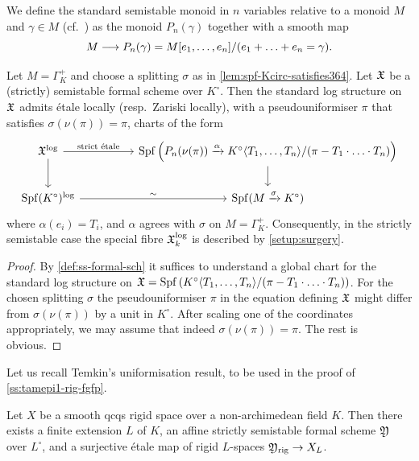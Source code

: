 We define the standard semistable monoid in $n$ variables relative to a monoid $M$ and $\gamma \in M$ (cf.\ \cite[Example~2.4.5]{AHLS-Log}) as the monoid $P_n(\gamma)$ together with a smooth map 
\[
M \longrightarrow P_n(\gamma) = M[e_1,\ldots,e_n]/(e_1 + \ldots + e_n = \gamma).
\]

\begin{lem} \label{lem:strictly-semistable-formal-scheme-reduces-to-setup364}
Let $M = \Gamma_K^+$ and choose a splitting $\sigma$ as in \cref{lem:spf-Kcirc-satisfies364}. 
Let ${\mathfrak{X}}$ be a (strictly) semistable formal scheme over $K^\circ$. Then the standard log structure on ${\mathfrak{X}}$ admits \'etale  locally (resp.\ Zariski locally), with a pseudouniformiser $\pi$ that satisfies 
$\sigma(\nu(\pi)) = \pi$, charts of the form 
\[
    \begin{tikzcd}
        \fX^{\log} \arrow[rr,"\text{strict \'etale}"] \arrow[d]
        && \Spf\left(P_n(\nu(\pi)) \xrightarrow{\alpha} K^\circ\langle T_1,\dots, T_n\rangle/(\pi - T_1\cdot\ldots\cdot T_n) \right) \arrow[d] \\
        \Spf(K^\circ)^{\log}  \arrow[rr,"\sim"] & &  
        \Spf(M \xrightarrow{\sigma} K^\circ) 
    \end{tikzcd}
\]
where $\alpha(e_i) = T_i$, and $\alpha$ agrees with $\sigma$ on $M = \Gamma_K^+$.
Consequently, in the strictly semistable case the special fibre ${\mathfrak{X}}^{\log}_k$ is described by \cref{setup:surgery}. 
\end{lem}

\begin{proof}
    By \cref{def:ss-formal-sch} it suffices to understand a global chart for the standard log structure on ${\mathfrak{X}} = \operatorname{Spf}\left( K^\circ\langle T_1,\dots, T_n\rangle/(\pi - T_1\cdot\ldots\cdot T_n) \right)$. For the chosen splitting $\sigma$ the pseudouniformiser $\pi$ in the equation defining ${\mathfrak{X}}$ might differ from $\sigma(\nu(\pi))$ by a unit in $K^\circ$. After scaling one of the coordinates appropriately, we may assume that indeed $\sigma(\nu(\pi)) = \pi$. The rest is obvious.     
\end{proof}

Let us recall Temkin's uniformisation result, to be used in the proof of \cref{ss:tamepi1-rig-fgfp}.

\begin{thm} \label{thm:Temkin-unif}
    Let $X$ be a smooth qcqs rigid space over a non-archimedean field $K$. Then there exists a finite extension $L$ of $K$, an affine strictly semistable formal scheme ${\mathfrak{Y}}$ over $L^\circ$, and a surjective \'etale map of rigid $L$-spaces ${\mathfrak{Y}}_{\rm rig}\to X_L$.
\end{thm}

